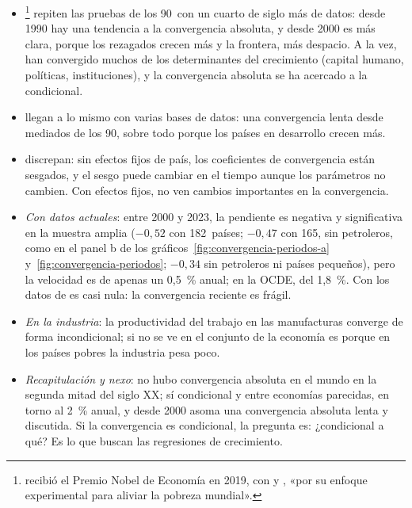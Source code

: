 \documentclass[11pt]{article}
\begin{document}
\begin{itemize}
\item \textcite{KremerWillisYou2022}\footnote{ recibió el Premio Nobel de Economía en 2019, con  y , «por su enfoque experimental para aliviar la pobreza mundial»\nocite{NobelPrize2019}.} repiten las pruebas de los 90~con un cuarto de siglo más de datos: desde 1990 hay una tendencia a la convergencia absoluta, y desde 2000 es más clara, porque los rezagados crecen más y la frontera, más despacio. A la vez, han convergido muchos de los determinantes del crecimiento (capital humano, políticas, instituciones), y la convergencia absoluta se ha acercado a la condicional\nocite{Campante2021}.
\item \textcite{PatelSandefurSubramanian2021} llegan a lo mismo con varias bases de datos: una convergencia lenta desde mediados de los 90, sobre todo porque los países en desarrollo crecen más.
\item \textcite{AcemogluMolina2022} discrepan: sin efectos fijos de país, los coeficientes de convergencia están sesgados, y el sesgo puede cambiar en el tiempo aunque los parámetros no cambien. Con efectos fijos, no ven cambios importantes en la convergencia.
\item \emph{Con datos actuales}: entre 2000 y 2023, la pendiente es negativa y significativa en la muestra amplia ($-0{,}52$ con 182~países; $-0{,}47$ con 165, sin petroleros, como en el panel b de los gráficos~\ref{fig:convergencia-periodos-a} y~\ref{fig:convergencia-periodos}; $-0{,}34$ sin petroleros ni países pequeños), pero la velocidad es de apenas un 0,5~\% anual; en la OCDE, del 1,8~\%. Con los datos de  es casi nula: la convergencia reciente es frágil\nocite{GGDC2025PWT,BoltvanZanden2025}.
\item \emph{En la industria}: la productividad del trabajo en las manufacturas converge de forma incondicional; si no se ve en el conjunto de la economía es porque en los países pobres la industria pesa poco\nocite{Rodrik2013}.
\item \emph{Recapitulación y nexo}: no hubo convergencia absoluta en el mundo en la segunda mitad del siglo XX; sí condicional y entre economías parecidas, en torno al 2~\% anual, y desde 2000 asoma una convergencia absoluta lenta y discutida. Si la convergencia es condicional, la pregunta es: ¿condicional a qué? Es lo que buscan las regresiones de crecimiento.
\end{itemize}
\end{document}
